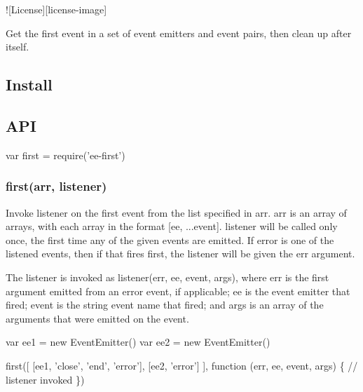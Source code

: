 \href{https://npmjs.org/package/ee-first}{\tt } \href{https://travis-ci.org/jonathanong/ee-first}{\tt } \href{https://coveralls.io/r/jonathanong/ee-first?branch=master}{\tt } !\mbox{[}License\mbox{]}\mbox{[}license-\/image\mbox{]} \href{https://npmjs.org/package/ee-first}{\tt } \href{https://www.gittip.com/jonathanong/}{\tt }

Get the first event in a set of event emitters and event pairs, then clean up after itself.

\subsection*{Install}




\subsection*{A\+PI}


\begin{DoxyCode}
var first = require('ee-first')
\end{DoxyCode}


\subsubsection*{first(arr, listener)}

Invoke {\ttfamily listener} on the first event from the list specified in {\ttfamily arr}. {\ttfamily arr} is an array of arrays, with each array in the format {\ttfamily \mbox{[}ee, ...event\mbox{]}}. {\ttfamily listener} will be called only once, the first time any of the given events are emitted. If {\ttfamily error} is one of the listened events, then if that fires first, the {\ttfamily listener} will be given the {\ttfamily err} argument.

The {\ttfamily listener} is invoked as {\ttfamily listener(err, ee, event, args)}, where {\ttfamily err} is the first argument emitted from an {\ttfamily error} event, if applicable; {\ttfamily ee} is the event emitter that fired; {\ttfamily event} is the string event name that fired; and {\ttfamily args} is an array of the arguments that were emitted on the event.


\begin{DoxyCode}
var ee1 = new EventEmitter()
var ee2 = new EventEmitter()

first([
  [ee1, 'close', 'end', 'error'],
  [ee2, 'error']
], function (err, ee, event, args) \{
  // listener invoked
\})
\end{DoxyCode}


